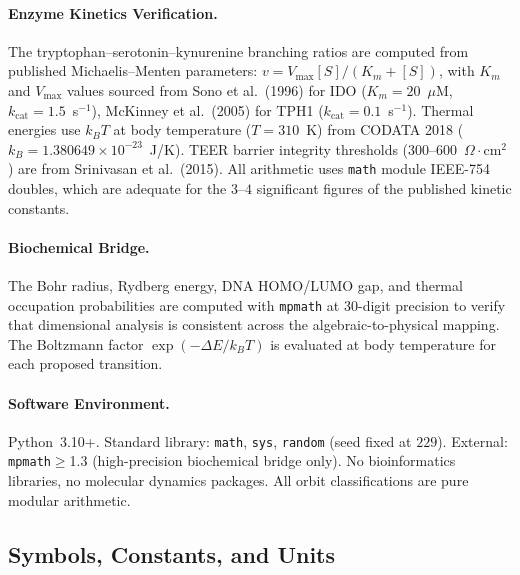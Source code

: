 \paragraph{Enzyme Kinetics Verification.}
The tryptophan--serotonin--kynurenine branching ratios are computed from published Michaelis--Menten parameters: $v = V_{\max} [S] / (K_m + [S])$, with $K_m$ and $V_{\max}$ values sourced from Sono et al.\ (1996) for IDO ($K_m = 20$~$\mu$M, $k_{\mathrm{cat}} = 1.5$~s$^{-1}$), McKinney et al.\ (2005) for TPH1 ($k_{\mathrm{cat}} = 0.1$~s$^{-1}$). Thermal energies use $k_B T$ at body temperature ($T = 310$~K) from CODATA 2018 ($k_B = 1.380649 \times 10^{-23}$~J/K). TEER barrier integrity thresholds ($300$--$600$~$\Omega \cdot$cm$^2$) are from Srinivasan et al.\ (2015). All arithmetic uses \texttt{math} module IEEE-754 doubles, which are adequate for the $3$--$4$ significant figures of the published kinetic constants.

\paragraph{Biochemical Bridge.}
The Bohr radius, Rydberg energy, DNA HOMO/LUMO gap, and thermal occupation probabilities are computed with \texttt{mpmath} at 30-digit precision to verify that dimensional analysis is consistent across the algebraic-to-physical mapping. The Boltzmann factor $\exp(-\Delta E / k_B T)$ is evaluated at body temperature for each proposed transition.

\paragraph{Software Environment.}
Python~3.10+. Standard library: \texttt{math}, \texttt{sys}, \texttt{random} (seed fixed at $229$). External: \texttt{mpmath}$\geq$1.3 (high-precision biochemical bridge only). No bioinformatics libraries, no molecular dynamics packages. All orbit classifications are pure modular arithmetic.

\subsection{Symbols, Constants, and Units}

